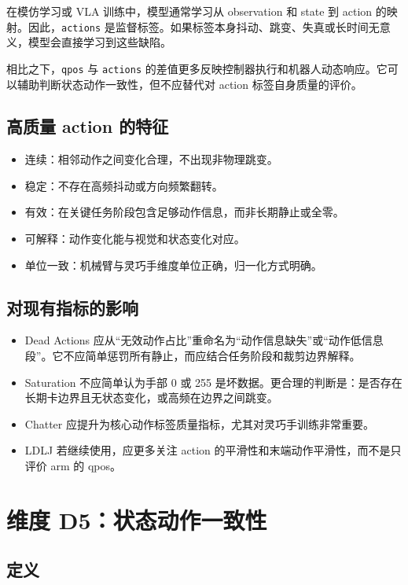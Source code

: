 \documentclass[UTF8,zihao=-4,oneside,openany]{ctexrep}
\begin{document}
在模仿学习或 VLA 训练中，模型通常学习从 observation 和 state 到 action 的映射。因此，\texttt{actions} 是监督标签。如果标签本身抖动、跳变、失真或长时间无意义，模型会直接学习到这些缺陷。

相比之下，\texttt{qpos} 与 \texttt{actions} 的差值更多反映控制器执行和机器人动态响应。它可以辅助判断状态动作一致性，但不应替代对 action 标签自身质量的评价。

\subsection{高质量 action 的特征}

\begin{itemize}
  \item 连续：相邻动作之间变化合理，不出现非物理跳变。
  \item 稳定：不存在高频抖动或方向频繁翻转。
  \item 有效：在关键任务阶段包含足够动作信息，而非长期静止或全零。
  \item 可解释：动作变化能与视觉和状态变化对应。
  \item 单位一致：机械臂与灵巧手维度单位正确，归一化方式明确。
\end{itemize}

\subsection{对现有指标的影响}

\begin{itemize}
  \item Dead Actions 应从“无效动作占比”重命名为“动作信息缺失”或“动作低信息段”。它不应简单惩罚所有静止，而应结合任务阶段和裁剪边界解释。
  \item Saturation 不应简单认为手部 0 或 255 是坏数据。更合理的判断是：是否存在长期卡边界且无状态变化，或高频在边界之间跳变。
  \item Chatter 应提升为核心动作标签质量指标，尤其对灵巧手训练非常重要。
  \item LDLJ 若继续使用，应更多关注 action 的平滑性和末端动作平滑性，而不是只评价 arm 的 qpos。
\end{itemize}

\section{维度 D5：状态动作一致性}

\subsection{定义}
\end{document}
